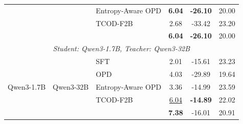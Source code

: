 \begin{table}[t]
\begin{tabular}{lllccc}
 & & Entropy-Aware OPD & \textbf{6.04} & \textbf{-26.10} & 20.00 \\
 & & TCOD-F2B & 2.68 & -33.42 & 23.20 \\
 & & \ours{} & \textbf{6.04} & \textbf{-26.10} & 20.00 \\
\midrule
\multicolumn{6}{c}{\textit{Student: Qwen3-1.7B, Teacher: Qwen3-32B}} \\
\midrule
\multirow{5}{*}{Qwen3-1.7B} & \multirow{5}{*}{Qwen3-32B} & SFT & 2.01 & -15.61 & 23.23 \\
 & & OPD & 4.03 & -29.89 & 19.64 \\
 & & Entropy-Aware OPD & 3.36 & -14.99 & 23.59 \\
 & & TCOD-F2B & \underline{6.04} & \textbf{-14.89} & 22.02 \\
 & & \ours{} & \textbf{7.38} & -16.01 & 20.91 \\
\bottomrule
\end{tabular}%
\end{table}


